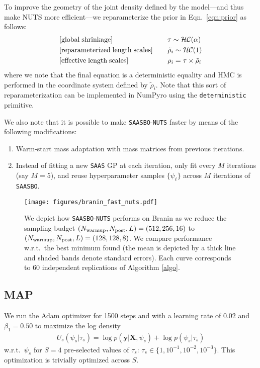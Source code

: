 \documentclass[accepted]{uai2021} %
\newcommand{\algoname}{{\texttt {SAASBO}}}
\newcommand{\priorname}{{\texttt {SAAS}}}
\newcommand{\by}{\mathbf{y}}
\newcommand{\bX}{\mathbf{X}}
\begin{document}
To improve the geometry of the joint density defined by the model---and thus make NUTS
more efficient---we reparameterize the prior in Eqn.~\eqref{eqn:prior} as follows:
\begin{align}
&[{\rm global \; shrinkage}] \;\;\;\;      &&\tau \sim  \mathcal{HC}(\alpha)     \\
&[\rm reparameterized \; length \; scales] \;\;\;\;              && \tilde{\rho}_i \sim  \mathcal{HC}(1) \nonumber \\
&[{\rm effective \;length \; scales}] \;\;\;\;              && \rho_i = \tau \times \tilde{\rho}_i \nonumber
\end{align}
where we note that the final equation is a deterministic equality and HMC is performed in
the coordinate system defined by $\tilde{\rho}_i$. Note that this sort of reparameterization
can be implemented in NumPyro using the \texttt{deterministic} primitive.

We also note that it is possible to make \algoname-\texttt{NUTS} faster by means of the following modifications:
\begin{enumerate}
\item Warm-start mass adaptation with mass matrices from previous iterations.
\item Instead of fitting a new \priorname{} GP at each iteration, only fit
    every $M$ iterations (say $M=5$), and reuse hyperparameter samples $\{ \psi_\ell \}$
        across $M$ iterations of \algoname.
\end{enumerate}

\begin{figure}[!ht]
  \centering
  \texttt{[image: figures/branin\_fast\_nuts.pdf]}
    \caption{
        We depict how \algoname-\texttt{NUTS} performs on Branin
        as we reduce the sampling budget
        $(N_{\rm warmup}, N_{\rm post}, L) = (512, 256, 16)$
        to $(N_{\rm warmup}, N_{\rm post}, L) = (128, 128, 8)$.
    We compare performance w.r.t.~the best minimum found
    (the mean is depicted by a thick line and shaded bands denote standard errors).
    Each curve corresponds to $60$ independent replications of Algorithm \ref{algo}.
}
  \label{fig:fastnuts}
\end{figure}

\subsection{MAP}
\label{sec:suppmap}
We run the Adam optimizer \citep{kingma2014adam} for 1500 steps and with a learning
rate of $0.02$ and $\beta_1=0.50$  to maximize the log density
\begin{align}
U_s(\psi_s | \tau_s) = \log p(\by|\bX, \psi_s) + \log p(\psi_s | \tau_s)
\end{align}
w.r.t.~$\psi_s$
for $S=4$ pre-selected values of $\tau_s$: $\tau_s \in \{1, 10^{-1},10^{-2},10^{-3}\}$.
This optimization is trivially optimized across $S$.
\end{document}
